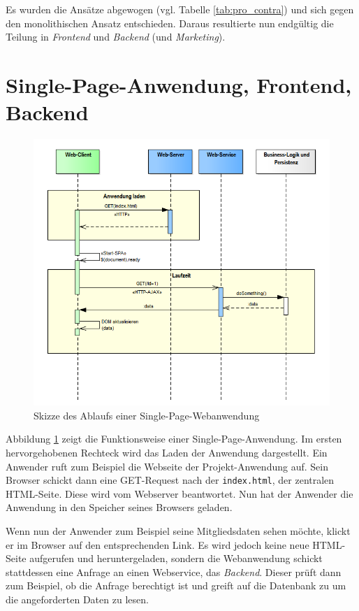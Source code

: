 \documentclass[a4paper, 11pt]{article}
\begin{document}
Es wurden die Ansätze abgewogen (vgl. Tabelle \ref{tab:pro_contra}) und sich
gegen den monolithischen Ansatz entschieden. Daraus resultierte nun endgültig
die Teilung in \emph{Frontend} und \emph{Backend} (und \emph{Marketing}).

\section{Single-Page-Anwendung, Frontend, Backend}

\begin{figure}[htpb]
    \centering
    \includegraphics[width=\textwidth]{images/SPA_Start.png}
    \caption{Skizze des Ablaufs einer Single-Page-Webanwendung}
    \label{fig:spa_start}
\end{figure}

Abbildung \ref{fig:spa_start} zeigt die Funktionsweise einer
Single-Page-Anwendung. Im ersten hervorgehobenen Rechteck wird das Laden der
Anwendung dargestellt. Ein Anwender ruft zum Beispiel die Webseite der
Projekt-Anwendung auf. Sein Browser schickt dann eine GET-Request nach der
\texttt{index.html}, der zentralen HTML-Seite. Diese wird vom Webserver
beantwortet. Nun hat der Anwender die Anwendung in den Speicher seines Browsers
geladen. 

Wenn nun der Anwender zum Beispiel seine Mitgliedsdaten sehen möchte, klickt er
im Browser auf den entsprechenden Link. Es wird jedoch keine neue HTML-Seite
aufgerufen und heruntergeladen, sondern die Webanwendung schickt stattdessen
eine Anfrage an einen Webservice, das \emph{Backend}. Dieser prüft dann zum
Beispiel, ob die Anfrage berechtigt ist und greift auf die Datenbank zu um die
angeforderten Daten zu lesen.
\end{document}
